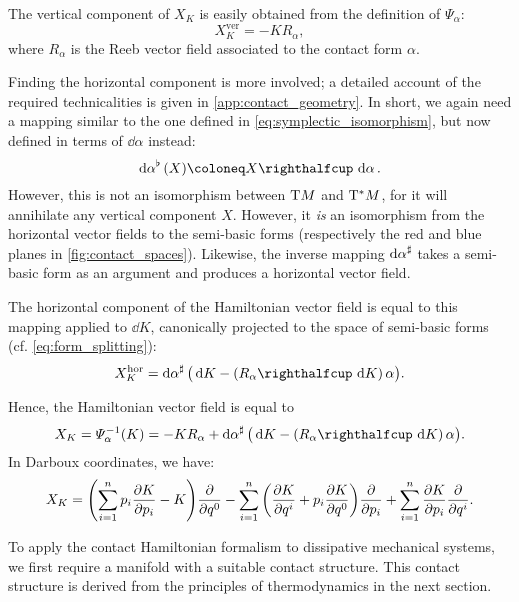 The vertical component of \(X_K\) is easily obtained from the definition of \(\Psi_\alpha\):
\begin{equation}
    X_K^\text{ver} = -K R_\alpha,
    \label{eq:vertical_vf}
\end{equation}
where \(R_\alpha\) is the Reeb vector field
associated to the contact form \(\alpha\).

Finding the horizontal component is more involved; a detailed account of the required technicalities is given in \cref{app:contact_geometry}. In short, we again need a mapping similar to the one defined in \cref{eq:symplectic_isomorphism}, but now defined in terms of \(\dd{\alpha}\) instead:
\begin{equation}
    \toDual{\dd{\alpha}}(X) \coloneq \intpr{X}{\dd{\alpha}}.
    \label{eq:contact_isomorphism}
\end{equation}
However, this is not an isomorphism between \(\mathrm{T}M\) and \(\mathrm{T}^*M\), for it will annihilate any vertical component \(X\). However, it \emph{is} an isomorphism from the horizontal vector fields to the semi-basic forms (respectively the red and blue planes in \cref{fig:contact_spaces}). Likewise, the inverse mapping \(\dd{\alpha}^\sharp\) takes a semi-basic form as an argument and produces a horizontal vector field. 

The horizontal component of the Hamiltonian vector field is equal to this mapping applied to \(\dd{K}\), canonically projected to the space of semi-basic forms (cf. \cref{eq:form_splitting}):
\begin{equation}
    X_K^\text{hor} = \fromDual{\dd{\alpha}}\big(\dd{K} - (\intpr{R_\alpha}{\dd{K}})\,\alpha\big).
    \label{eq:horizontal_vf}
\end{equation}

Hence, the Hamiltonian vector field is equal to
\begin{equation}
    X_K = \Psi^{-1}_\alpha(K) = -K R_\alpha + \fromDual{\dd{\alpha}}\big(\dd{K} - (\intpr{R_\alpha}{\dd{K}})\,\alpha\big).
    \label{eq:contact_hamiltonian_vf}
\end{equation}
In Darboux coordinates, we have:
\begin{equation}
    X_K = \qty(\sum_{i=1}^n p_i\pdv{K}{p_i} - K) \pdv{}{q^0}- \sum_{i = 1}^n \qty(\pdv{K}{q^i} + p_i \pdv{K}{q^0})\pdv{}{p_i} + \sum_{i=1}^n \pdv{K}{p_i}\pdv{}{q^i}.
\end{equation}

To apply the contact Hamiltonian formalism to dissipative mechanical systems, we first require a manifold with a suitable contact structure. This contact structure is derived from the principles of thermodynamics in the next section.

